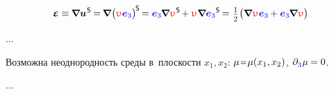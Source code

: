 \begin{otherlanguage}{russian}
\nopagebreak\vspace{-0.25em}\begin{equation*}
\mathboldepsilon \equiv
\hspace{-0.1ex} \boldnabla {\bm{u}}^{\hspace{.1ex}\mathsf{S}} \hspace{-0.2ex}
= \hspace{-0.2ex} \boldnabla \hspace{.1ex} \bigl( \antiplanedisplacement \hspace{.1ex} \mathcolor{blue}{\bm{e}_3} \bigr)^{\hspace{-0.2ex}\mathsf{S}} \hspace{-0.25ex}
= \mathcolor{blue}{\bm{e}_3} \hspace{-0.15ex} \boldnabla \hspace{.1ex} \antiplanedisplacement^{\hspace{.1ex}\mathsf{S}} \hspace{-0.25ex}
+ \antiplanedisplacement \hspace{.1ex} \tikzmark{beginZero2} \boldnabla \mathcolor{blue}{\bm{e}_3}\tikzmark{endZero2}^{\mathsf{S}} \hspace{-0.2ex}
= \hspace{.1ex} \smalldisplaystyleonehalf \hspace{.1ex} \bigl( \boldnabla \hspace{.1ex} \antiplanedisplacement \hspace{.12ex} \mathcolor{blue}{\bm{e}_3} \hspace{-0.1ex} + \mathcolor{blue}{\bm{e}_3} \hspace{-0.15ex} \boldnabla \hspace{.1ex} \antiplanedisplacement \bigr)
\end{equation*}%
%

...

Возможна неоднородность среды в~плоскости ${x_1, x_2}$: ${\mu \narroweq \mu(x_1, x_2)}$, ${\partial_{\raisemath{-0.15ex}{\mathcolor{blue}{3}}} \hspace{.08ex} \mu \hspace{-0.1ex} = 0}$.

...



\end{otherlanguage}


